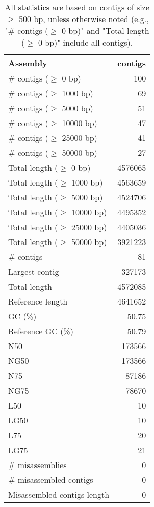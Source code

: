 \documentclass[12pt,a4paper]{article}
\begin{document}
\begin{table}[ht]
\begin{center}
\caption{All statistics are based on contigs of size $\geq$ 500 bp, unless otherwise noted (e.g., "\# contigs ($\geq$ 0 bp)" and "Total length ($\geq$ 0 bp)" include all contigs).}
\begin{tabular}{|l*{1}{|r}|}
\hline
Assembly & contigs \\ \hline
\# contigs ($\geq$ 0 bp) & 100 \\ \hline
\# contigs ($\geq$ 1000 bp) & 69 \\ \hline
\# contigs ($\geq$ 5000 bp) & 51 \\ \hline
\# contigs ($\geq$ 10000 bp) & 47 \\ \hline
\# contigs ($\geq$ 25000 bp) & 41 \\ \hline
\# contigs ($\geq$ 50000 bp) & 27 \\ \hline
Total length ($\geq$ 0 bp) & 4576065 \\ \hline
Total length ($\geq$ 1000 bp) & 4563659 \\ \hline
Total length ($\geq$ 5000 bp) & 4524706 \\ \hline
Total length ($\geq$ 10000 bp) & 4495352 \\ \hline
Total length ($\geq$ 25000 bp) & 4405036 \\ \hline
Total length ($\geq$ 50000 bp) & 3921223 \\ \hline
\# contigs & 81 \\ \hline
Largest contig & 327173 \\ \hline
Total length & 4572085 \\ \hline
Reference length & 4641652 \\ \hline
GC (\%) & 50.75 \\ \hline
Reference GC (\%) & 50.79 \\ \hline
N50 & 173566 \\ \hline
NG50 & 173566 \\ \hline
N75 & 87186 \\ \hline
NG75 & 78670 \\ \hline
L50 & 10 \\ \hline
LG50 & 10 \\ \hline
L75 & 20 \\ \hline
LG75 & 21 \\ \hline
\# misassemblies & 0 \\ \hline
\# misassembled contigs & 0 \\ \hline
Misassembled contigs length & 0 \\ \hline

\end{tabular}
\end{center}
\end{table}
\end{document}
